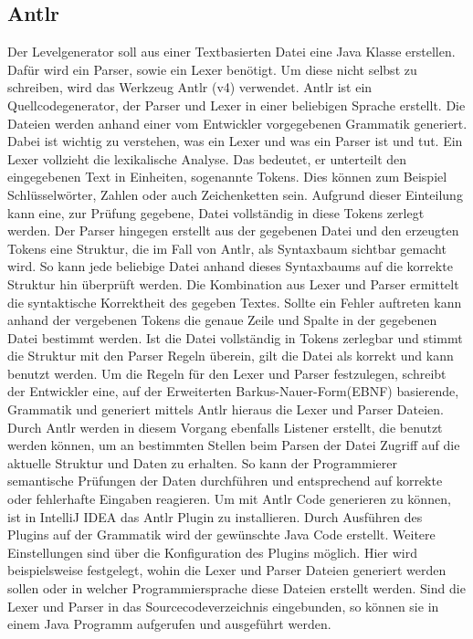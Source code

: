 \subsection{Antlr}

Der Levelgenerator soll aus einer Textbasierten Datei eine Java Klasse erstellen. Dafür wird ein Parser, sowie ein Lexer benötigt. Um diese nicht selbst zu schreiben, wird das Werkzeug Antlr (v4) verwendet.\newline
Antlr ist ein Quellcodegenerator, der Parser und Lexer in einer beliebigen Sprache erstellt. Die Dateien werden anhand einer vom Entwickler vorgegebenen Grammatik generiert. %
\newline
Dabei ist wichtig zu verstehen, was ein Lexer und was ein Parser ist und tut. \newline
Ein Lexer vollzieht die lexikalische Analyse. Das bedeutet, er unterteilt den eingegebenen Text in Einheiten, sogenannte Tokens. Dies können zum Beispiel Schlüsselwörter, Zahlen oder auch Zeichenketten sein. Aufgrund dieser Einteilung kann eine, zur Prüfung gegebene, Datei vollständig in diese Tokens zerlegt werden. 
\newline
Der Parser hingegen erstellt aus der gegebenen Datei und den erzeugten Tokens eine Struktur, die im Fall von Antlr, als Syntaxbaum sichtbar gemacht wird. So kann jede beliebige Datei anhand dieses Syntaxbaums auf die korrekte Struktur hin überprüft werden. %
\newline
Die Kombination aus Lexer und Parser ermittelt die syntaktische Korrektheit des gegeben Textes. Sollte ein Fehler auftreten kann anhand der vergebenen Tokens die genaue Zeile und Spalte in der gegebenen Datei bestimmt werden. Ist die Datei vollständig in Tokens zerlegbar und stimmt die Struktur mit den Parser Regeln überein, gilt die Datei als korrekt und kann benutzt werden.\newline
Um die Regeln für den Lexer und Parser festzulegen, schreibt der Entwickler eine, auf der Erweiterten Barkus-Nauer-Form(EBNF) basierende, Grammatik und generiert mittels Antlr hieraus die Lexer und Parser Dateien. Durch Antlr werden in diesem Vorgang ebenfalls Listener erstellt, die benutzt werden können, um an bestimmten Stellen beim Parsen der Datei Zugriff auf die aktuelle Struktur und Daten zu erhalten. So kann der Programmierer semantische Prüfungen der Daten durchführen und entsprechend auf korrekte oder fehlerhafte Eingaben reagieren.\newline
Um mit Antlr Code generieren zu können, ist in IntelliJ IDEA das Antlr Plugin zu installieren. Durch Ausführen des Plugins auf der Grammatik wird der gewünschte Java Code erstellt.\newline
Weitere Einstellungen sind über die Konfiguration des Plugins möglich. Hier wird beispielsweise festgelegt, wohin die Lexer und Parser Dateien generiert werden sollen oder in welcher Programmiersprache diese Dateien erstellt werden. 
Sind die Lexer und Parser in das Sourcecodeverzeichnis eingebunden, so können sie in einem Java Programm aufgerufen und ausgeführt werden.
